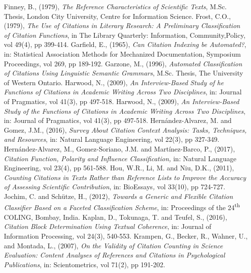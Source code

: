 \documentclass[runningheads,a4paper]{llncs}
\begin{document}
\begin{thebibliography}{4}
 Finney, B., (1979), {\em The Reference Characteristics of Scientific Texts}, M.Sc. Thesis, London City University, Centre for Information Science.
 Frost, C.O., (1979), {\em The Use of Citations in Literary Research: A Preliminary Classification of Citation Functions}, in The Library Quarterly: Information, Community,{\em }Policy, vol 49(4), pp 399-414.
 Garfield, E., (1965), {\em Can Citation Indexing be Automated?}, in: Statistical Association Methods for Mechanized Documentation, Symposium Proceedings, vol 269, pp 189-192.
 Garzone, M., (1996), {\em Automated Classification of Citations Using Linguistic Semantic Grammars}, M.Sc. Thesis, The University of Western Ontario.
 Harwood, N., (2009), {\em An Interview-Based Study of he Functions of Citations in Academic Writing Across Two Disciplines}, in: Journal of Pragmatics{\em , }vol 41(3), pp 497-518.
 Harwood, N., (2009), {\em An Interview-Based Study of the Functions of Citations in Academic Writing Across Two Disciplines}, in: Journal of Pragmatics, vol 41(3), pp 497-518.
 Hern\'andez-Alvarez, M. and Gomez, J.M., (2016), {\em Survey About Citation Context Analysis: Tasks, Techniques, and Resources}, in: Natural Language Engineering, vol 22(3), pp 327-349.
 Hern\'andez-Alvarez, M., Gomez-Soriano, J.M. and Mart\'inez-Barco, P., (2017), {\em Citation Function, Polarity and Influence Classification,} in: Natural Language Engineering, vol 23(4), pp 561-588.
 Hou, W.R., Li, M. and Niu, D.K., (2011), {\em Counting Citations in Texts Rather than Reference Lists to Improve the Accuracy of Assessing Scientific Contribution}, in: BioEssays{\em , }vol 33(10), pp 724-727.
 Jochim, C. and Schütze, H., (2012), {\em Towards a Generic and Flexible Citation Classifier Based on a Faceted Classification Scheme}, in: Proceedings of the 24\textsuperscript{th} COLING, Bombay, India.
 Kaplan, D., Tokunaga, T. and Teufel, S., (2016), {\em Citation Block Determination Using Textual Coherence}, in: Journal of Information Processing, vol 24(3), 540-553.
 Krampen, G., Becker, R., Wahner, U., and Montada, L., (2007), {\em On the Validity of Citation Counting in Science Evaluation: Content Analyses of References and Citations in Psychological Publications}, in: Scientometrics, vol 71(2), pp 191-202.

\end{thebibliography}
\end{document}
